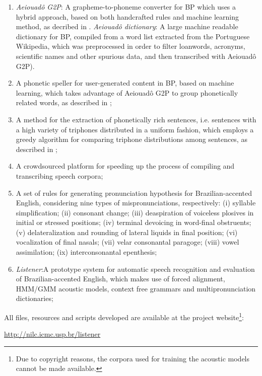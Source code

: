 \begin{enumerate}
 \item \emph{Aeiouad\^o G2P}: A grapheme-to-phoneme converter for \ac{BP} which uses a hybrid approach, based on both handcrafted rules and machine learning method, as decribed in \citeauthor{Mendonca2014} \cite{Mendonca2014}. \emph{Aeiouad\^o dictionary}: A large machine readable dictionary for \ac{BP}, compiled from a word list extracted from the Portuguese Wikipedia, which was preprocessed in order to filter loanwords, acronyms, scientific names and other spurious data, and then transcribed with Aeiouad\^o G2P).
 \item A phonetic speller for user-generated content in \ac{BP}, based on machine learning, which takes advantage of Aeiouad\^o G2P to group phonetically related words, as described in \citeauthor{Mendonca2015} \cite{Mendonca2015}; 
 \item A method for the extraction of phonetically rich sentences, i.e. sentences with a high variety of triphones distributed in a uniform fashion, which employs a greedy algorithm for comparing triphone distributions among sentences, as described in \citeauthor{Mendonca2014b} \cite{Mendonca2014b};
 \item A crowdsourced platform for speeding up the process of compiling and transcribing speech corpora;
 \item A set of rules for generating pronunciation hypothesis for Brazilian-accented English, considering nine types of mispronunciations, respectively: (i) syllable simplification; (ii) consonant change; (iii) deaspiration of voiceless plosives in initial or stressed positions; (iv) terminal devoicing in word-final obstruents; (v) delateralization and rounding of lateral liquids in final position; (vi) vocalization of final nasals; (vii) velar consonantal paragoge; (viii) vowel assimilation; (ix) interconsonantal epenthesis;
 \item \emph{Listener}:A prototype system for automatic speech recognition and evaluation of Brazilian-accented English, which makes use of forced alignment, \ac{HMM}/\ac{GMM} acoustic models, context free grammars and multipronunciation dictionaries;
\end{enumerate}

All files, resources and scripts developed are available at the project website\footnote{Due to copyright reasons, the corpora used for training the acoustic models cannot be made available.}: 
\begin{center}
 \url{http://nilc.icmc.usp.br/listener}
\end{center}


